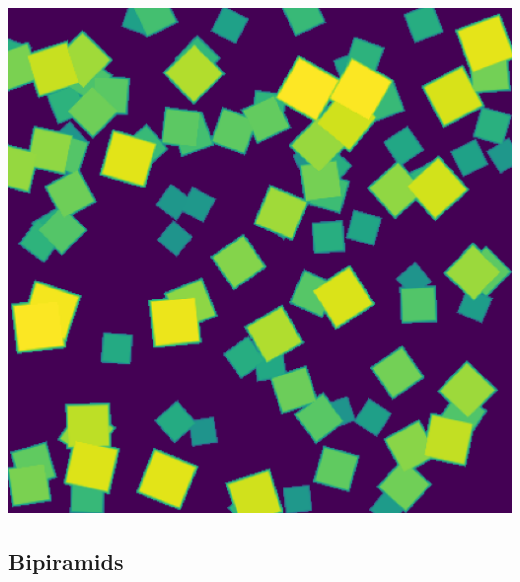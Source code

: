\documentclass{article}
\begin{document}
\begin{center}
\begin{minipage}{0.3\textwidth}
    \end{minipage}
    \hfill
    \begin{minipage}{0.3\textwidth}
        \includegraphics*[width=\linewidth]{../images/nanosheet_statistica.png}
    \end{minipage}
\end{center}

\subsection{Bipiramids}\label{subsec:Bipiramids}
\end{document}

